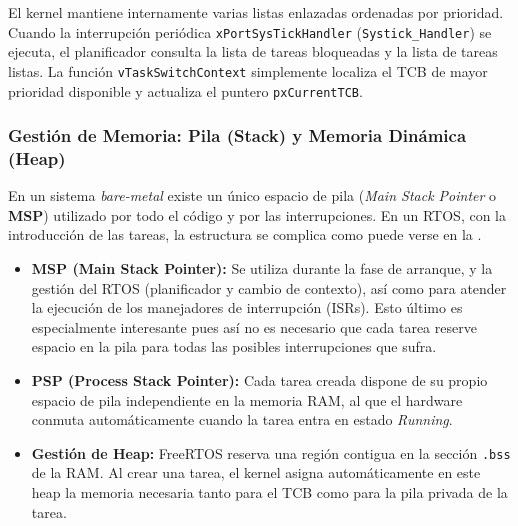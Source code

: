 \documentclass[../main.tex]{subfiles}
\begin{document}
            El kernel mantiene internamente varias listas enlazadas ordenadas por prioridad. Cuando la interrupción periódica \texttt{xPortSysTickHandler} (\texttt{Systick\_Handler}) se ejecuta, el planificador consulta la lista de tareas bloqueadas y la lista de tareas listas. La función \texttt{vTaskSwitchContext} simplemente localiza el TCB de mayor prioridad disponible y actualiza el puntero \texttt{pxCurrentTCB}.

        \subsubsection{Gestión de Memoria: Pila (Stack) y Memoria Dinámica (Heap)}

            En un sistema \textit{bare-metal} existe un único espacio de pila (\textit{Main Stack Pointer} o \textbf{MSP}) utilizado por todo el código y por las interrupciones. En un RTOS, con la introducción de las tareas, la estructura se complica como puede verse en la .

            \begin{itemize}
                \item \textbf{MSP (Main Stack Pointer):} Se utiliza durante la fase de arranque, y la gestión del RTOS (planificador y cambio de contexto), así como para atender la ejecución de los manejadores de interrupción (ISRs). Esto último es especialmente interesante pues así no es necesario que cada tarea reserve espacio en la pila para todas las posibles interrupciones que sufra.
                \item \textbf{PSP (Process Stack Pointer):} Cada tarea creada dispone de su propio espacio de pila independiente en la memoria RAM, al que el hardware conmuta automáticamente cuando la tarea entra en estado \textit{Running}.
                \item \textbf{Gestión de Heap:} FreeRTOS reserva una región contigua en la sección \texttt{.bss} de la RAM. Al crear una tarea, el kernel asigna automáticamente en este heap la memoria necesaria tanto para el TCB como para la pila privada de la tarea. 
            \end{itemize}
\end{document}
